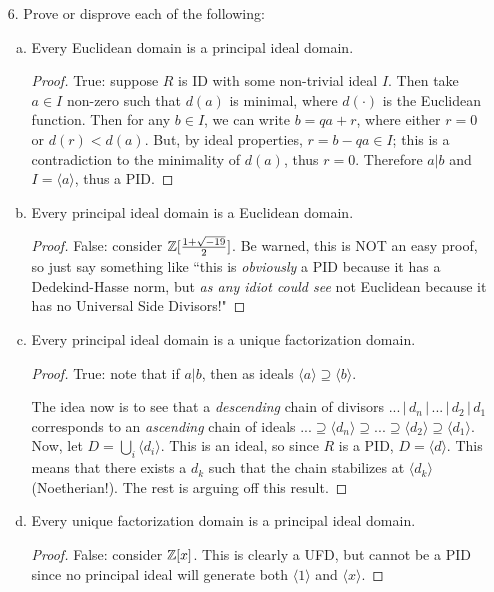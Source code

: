 \begin{itemize}
\item[6.] Prove or disprove each of the following:
\begin{enumerate}[(a)]
    \item Every Euclidean domain is a principal ideal domain.
    \begin{proof}
    True: suppose $R$ is ID with some non-trivial ideal $I$. Then take $a \in I$ non-zero such that $d(a)$ is minimal, where $d(\cdot)$ is the Euclidean function. Then for any $b \in I$, we can write $b = qa + r$, where either $r=0$ or $d(r) < d(a)$. But, by ideal properties, $r = b - qa \in I$; this is a contradiction to the minimality of $d(a)$, thus $r=0$. Therefore $a|b$ and $I = \langle a \rangle$, thus a PID.
    \end{proof}
    
    \item Every principal ideal domain is a Euclidean domain.
    \begin{proof}
    False: consider $\mathbb{Z}[\frac{1+\sqrt{-19}}{2}]$. Be warned, this is NOT an easy proof, so just say something like ``this is \textit{obviously} a PID because it has a Dedekind-Hasse norm, but \textit{as any idiot could see} not Euclidean because it has no Universal Side Divisors!"
    \end{proof}
    
    \item Every principal ideal domain is a unique factorization domain.
    \begin{proof}
    True: note that if $a|b$, then as ideals $\langle a \rangle \supseteq \langle b \rangle$.
    \medskip 

    The idea now is to see that a \textit{descending} chain of divisors $... \, |\, d_n\,|\,...\,|\,d_2\,|\,d_1$ corresponds to an \textit{ascending} chain of ideals $...\supseteq \langle d_n \rangle \supseteq ... \supseteq \langle d_2 \rangle \supseteq \langle d_1 \rangle$.
    Now, let $D = \bigcup_i \langle d_i \rangle$. This is an ideal, so since $R$ is a PID, $D = \langle d \rangle$. This means that there exists a $d_k$ such that the chain stabilizes at $\langle d_k \rangle$ (Noetherian!). The rest is arguing off this result.
    \end{proof}
    
    \item Every unique factorization domain is a principal ideal domain.
    \begin{proof}
    False: consider $\mathbb{Z}[x]$. This is clearly a UFD, but cannot be a PID since no principal ideal will generate both $\langle 1 \rangle$ and $\langle x \rangle$.
    \end{proof}
    

\end{enumerate}
\end{itemize}

